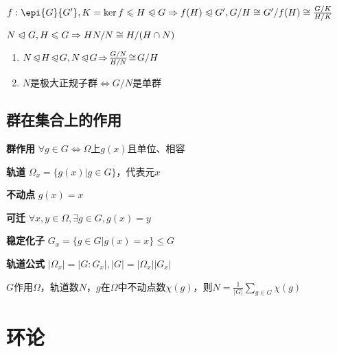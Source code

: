 \documentclass[a4paper,10pt]{ctexart}
\newcommand*{\impl}{\Rightarrow}
\renewcommand*{\iff}{\Leftrightarrow}
\renewcommand*{\leq}{\leqslant}
\newcommand*{\nmsubgroupeq}{\trianglelefteqslant}
\begin{document}
\begin{multicols}{3}
    \begin{theorem}
        \hfil

        $f: \epi{G}{G'}, K = \ker f \leq H \nmsubgroupeq G \impl f(H) \nmsubgroupeq G', G/H \cong G'/f(H) \cong \frac{G/K}{H/K}$
    \end{theorem}

    \begin{theorem}
        \hfil

        $N \nmsubgroupeq G, H \leq G \impl HN/N \cong H/(H \cap N)$
    \end{theorem}

    \begin{theorem}[推论]
        \hfil
        \begin{enumerate}
            \item $N \!\nmsubgroupeq\! H \!\nmsubgroupeq\! G, N \!\nmsubgroupeq\! G \!\impl\! \frac{G/N}{H/N} \!\cong\! G/H$
            \item $N$是极大正规子群$\iff G/N$是单群
        \end{enumerate}
    \end{theorem}

    \subsection{群在集合上的作用}

    \textbf{群作用} $\forall g \in G \iff \Omega$上$g(x)$且单位、相容

    \textbf{轨道} $\Omega_x = \{ g(x) | g \in G \}$，代表元$x$

    \textbf{不动点} $g(x) = x$

    \textbf{可迁} $\forall x, y \in \Omega, \exists g \in G, g(x) = y$

    \textbf{稳定化子} $G_x \! = \! \{ g \!\in\! G | g(x) \! = \! x \} \!\leq\! G$

    \textbf{轨道公式} $|\Omega_x| = |G : G_x|, |G| = |\Omega_x||G_x|$

    \begin{theorem}[Burnside 引理]
        $G$作用$\Omega$，轨道数$N$，$g$在$\Omega$中不动点数$\chi(g)$，则$N = \frac{1}{|G|} \sum\limits_{g \in G} \chi(g)$
    \end{theorem}

    \section{环论}


\end{multicols}
\end{document}
